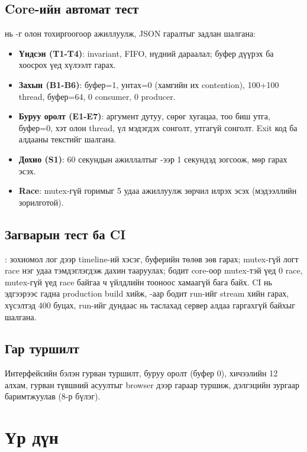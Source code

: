 \documentclass[12pt,a4paper]{article}
\begin{document}
\subsection{Core-ийн автомат тест}
 нь -г олон тохиргоогоор ажиллуулж, JSON гаралтыг задлан шалгана:
\begin{itemize}
  \item \textbf{Үндсэн (T1-T4)}: invariant, FIFO, нүдний дараалал; буфер дүүрэх ба хоосрох үед хүлээлт гарах.
  \item \textbf{Захын (B1-B6)}: буфер=1, унтах=0 (хамгийн их contention), 100+100 thread, буфер=64, 0 consumer, 0 producer.
  \item \textbf{Буруу оролт (E1-E7)}: аргумент дутуу, сөрөг хугацаа, тоо биш утга, буфер=0, хэт олон thread, үл мэдэгдэх сонголт, утгагүй сонголт. Exit код ба алдааны текстийг шалгана.
  \item \textbf{Дохио (S1)}: 60 секундын ажиллалтыг -ээр 1 секундэд зогсоож,  мөр гарах эсэх.
  \item \textbf{Race}: mutex-гүй горимыг 5 удаа ажиллуулж зөрчил илрэх эсэх (мэдээллийн зорилготой).
\end{itemize}

\subsection{Загварын тест ба CI}
: зохиомол лог дээр timeline-ий хэсэг, буферийн төлөв зөв гарах; mutex-гүй логт race нэг удаа тэмдэглэгдэж дахин тааруулах; бодит core-оор mutex-тэй үед 0 race, mutex-гүй үед race байгаа ч үйлдлийн тооноос хамаагүй бага байх. CI нь эдгээрээс гадна production build хийж, -аар бодит run-ийг stream хийн  гарах,  хүсэлтэд 400 буцах, run-ийг дундаас нь таслахад сервер алдаа гаргахгүй байхыг шалгана.

\subsection{Гар туршилт}
Интерфейсийн бэлэн гурван туршилт, буруу оролт (буфер 0), хичээлийн 12 алхам, гурван түвшний асуултыг browser дээр гараар туршиж, дэлгэцийн зургаар баримтжуулав (8-р бүлэг).

\section{Үр дүн}
\end{document}
